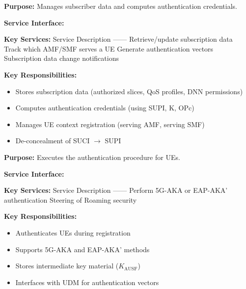
\textbf{Purpose:} Manages subscriber data and computes authentication credentials.

\textbf{Service Interface:} 

\textbf{Key Services:}\CNbr{}\textbar{} Service \textbar{} Description \textbar{}\CNbr{}\textbar{}—\textbar{}—\textbar{}\CNbr{}\textbar{} \allowbreak{} \textbar{} Retrieve/\allowbreak{}update subscription data \textbar{}\CNbr{}\textbar{} \allowbreak{} \textbar{} Track which AMF/\allowbreak{}SMF serves a UE \textbar{}\CNbr{}\textbar{} \allowbreak{} \textbar{} Generate authentication vectors \textbar{}\CNbr{}\textbar{}  \textbar{} Subscription data change notifications \textbar{}

\textbf{Key Responsibilities:}

\begin{itemize}
\tightlist
\item
  Stores subscription data (authorized slices, QoS profiles, DNN permissions)
\item
  Computes authentication credentials (using SUPI, K, OPc)
\item
  Manages UE context registration (serving AMF, serving SMF)
\item
  De-concealment of SUCI \ensuremath{\to} SUPI
\end{itemize}


\textbf{Purpose:} Executes the authentication procedure for UEs.

\textbf{Service Interface:} 

\textbf{Key Services:}\CNbr{}\textbar{} Service \textbar{} Description \textbar{}\CNbr{}\textbar{}—\textbar{}—\textbar{}\CNbr{}\textbar{} \allowbreak{} \textbar{} Perform 5G-AKA or EAP-AKA’ authentication \textbar{}\CNbr{}\textbar{} \allowbreak{} \textbar{} Steering of Roaming security \textbar{}

\textbf{Key Responsibilities:}

\begin{itemize}
\tightlist
\item
  Authenticates UEs during registration
\item
  Supports 5G-AKA and EAP-AKA’ methods
\item
  Stores intermediate key material (\ensuremath{K_{\mathrm{AUSF}}})
\item
  Interfaces with UDM for authentication vectors
\end{itemize}

